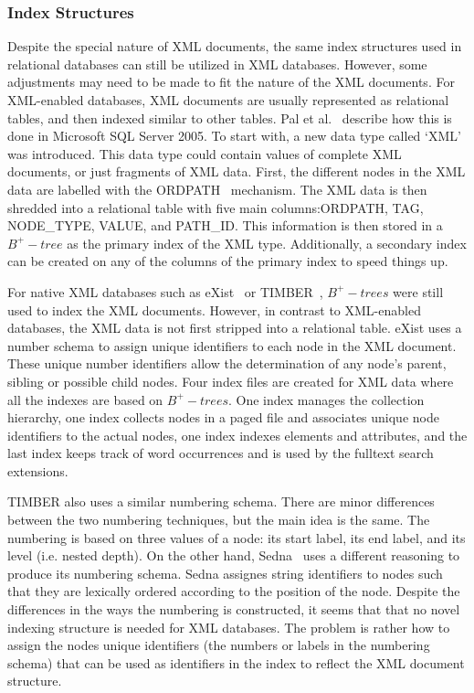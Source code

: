 \documentclass[12pt,a4paper]{article}
\begin{document}

\subsubsection{Index Structures}

Despite the special nature of XML documents, the same index structures used in relational databases can still be utilized in XML databases. However, some adjustments may need to be made to fit the nature of the XML documents. For XML-enabled databases, XML documents are usually represented as relational tables, and then indexed similar to other tables. Pal et al.~\cite{pal2004indexing} describe how this is done in Microsoft SQL Server 2005. To start with, a new data type called `XML' was introduced. This data type could contain values of complete XML documents, or just fragments of XML data. First, the different nodes in the XML data are labelled with the ORDPATH~\cite{o2004ordpaths} mechanism. The XML data is then shredded into a relational table with five main columns:ORDPATH, TAG, NODE\_TYPE, VALUE, and PATH\_ID. This information is then stored in a $B^{+}-tree$ as the primary index of the XML type. Additionally, a secondary index can be created on any of the columns of the primary index to speed things up.

For native XML databases such as eXist~\cite{meier2009exist} or TIMBER~\cite{jagadish2002timber}, $B^{+}-trees$ were still used to index the XML documents. However, in contrast to XML-enabled databases, the XML data is not first stripped into a relational table. eXist uses a number schema to assign unique identifiers to each node in the XML document. These unique number identifiers allow the determination of any node's parent, sibling or possible child nodes. Four index files are created for XML data where all the indexes are based on $B^{+}-trees$. One index manages the collection hierarchy, one index collects nodes in a paged file and associates unique node identifiers to the actual nodes, one index indexes elements and attributes, and the last index keeps track of word occurrences and is used by the fulltext search extensions.

TIMBER also uses a similar numbering schema. There are minor differences between the two numbering techniques, but the main idea is the same. The numbering is based on three values of a node: its start label, its end label, and its level (i.e. nested depth). On the other hand, Sedna~\cite{taranov2010sedna} uses a different reasoning to produce its numbering schema. Sedna assignes string identifiers to nodes such that they are lexically ordered according to the position of the node. Despite the differences in the ways the numbering is constructed, it seems that that no novel indexing structure is needed for XML databases. The problem is rather how to assign the nodes unique identifiers (the numbers or labels in the numbering schema) that can be used as identifiers in the index to reflect the XML document structure.
\end{document}

